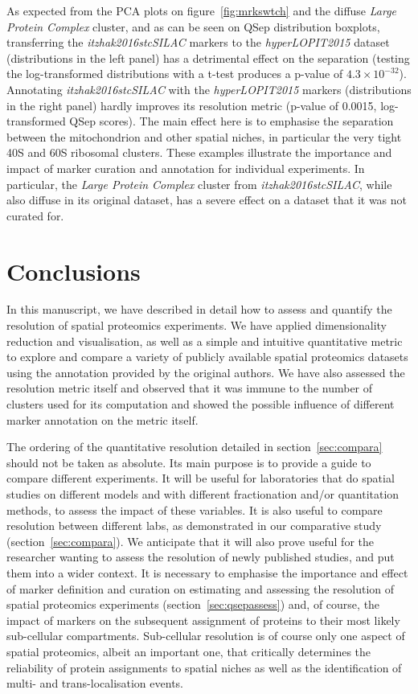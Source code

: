 \documentclass[12pt]{article}\usepackage[]{graphicx}\usepackage[]{color}
\begin{document}
As expected from the PCA plots on figure~\ref{fig:mrkswtch} and the
diffuse \textit{Large Protein Complex} cluster, and as can be seen on
QSep distribution boxplots, transferring the
\textit{itzhak2016stcSILAC} markers to the \textit{hyperLOPIT2015}
dataset (distributions in the left panel) has a detrimental effect on
the separation (testing the log-transformed distributions with a
t-test produces a p-value of \ensuremath{4.3\times 10^{-32}}). Annotating
\textit{itzhak2016stcSILAC} with the \textit{hyperLOPIT2015} markers
(distributions in the right panel) hardly improves its resolution
metric (p-value of 0.0015, log-transformed QSep
scores). The main effect here is to emphasise the separation between
the mitochondrion and other spatial niches, in particular the very
tight 40S and 60S ribosomal clusters. These examples illustrate the
importance and impact of marker curation and annotation for individual
experiments. In particular, the \textit{Large Protein Complex} cluster
from \textit{itzhak2016stcSILAC}, while also diffuse in its original
dataset, has a severe effect on a dataset that it was not curated for.

\section{Conclusions}

In this manuscript, we have described in detail how to assess and
quantify the resolution of spatial proteomics experiments. We have
applied dimensionality reduction and visualisation, as well as a
simple and intuitive quantitative metric to explore and compare a
variety of publicly available spatial proteomics datasets using the
annotation provided by the original authors. We have also assessed the
resolution metric itself and observed that it was immune to the number
of clusters used for its computation and showed the possible influence
of different marker annotation on the metric itself.

\bigskip

The ordering of the quantitative resolution detailed in
section~\ref{sec:compara} should not be taken as absolute. Its main
purpose is to provide a guide to compare different experiments. It
will be useful for laboratories that do spatial studies on different
models and with different fractionation and/or quantitation methods,
to assess the impact of these variables. It is also useful to compare
resolution between different labs, as demonstrated in our comparative
study (section~\ref{sec:compara}). We anticipate that it will also
prove useful for the researcher wanting to assess the resolution of
newly published studies, and put them into a wider context. It is
necessary to emphasise the importance and effect of marker definition
and curation on estimating and assessing the resolution of spatial
proteomics experiments (section~\ref{sec:qsepassess}) and, of course,
the impact of markers on the subsequent assignment of proteins to
their most likely sub-cellular compartments. Sub-cellular resolution
is of course only one aspect of spatial proteomics, albeit an
important one, that critically determines the reliability of protein
assignments to spatial niches as well as the identification of multi-
and trans-localisation events.
\end{document}
